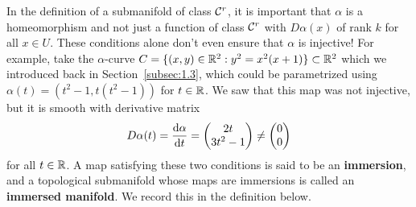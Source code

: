 In the definition of a submanifold of class ${\cal C}^r$, it is important that 
$\alpha$ is a homeomorphism and not just a function of class ${\cal C}^r$ 
with $D\alpha(x)$ of rank $k$ for all $x \in U$. These conditions alone
don't even ensure that $\alpha$ is injective! For example, take the 
$\alpha$-curve $C = \{(x, y) \in \mathbb{R}^2 : y^2 = x^2(x+1)\} \subset \mathbb{R}^2$ 
which we introduced back in Section~\ref{subsec:1.3}, which could be 
parametrized using $\alpha(t) = (t^2 - 1, t(t^2-1))$ for $t \in \mathbb{R}$. 
We saw that this map was not injective, but it is smooth with derivative matrix 
\[ D\alpha(t) = \frac{{\rm d}\alpha}{{\rm d}t} = \begin{pmatrix} 2t \\ 3t^2 - 1 \end{pmatrix} 
\neq \begin{pmatrix} 0 \\ 0 \end{pmatrix} \] 
for all $t \in \mathbb{R}$. A map satisfying these two conditions is said to be 
an {\bf immersion}, and a topological submanifold whose maps 
are immersions is called an {\bf immersed manifold}. We record this in 
the definition below. 

